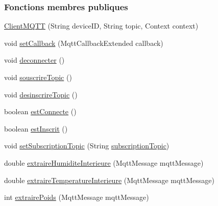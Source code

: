 \subsubsection*{Fonctions membres publiques}
\begin{DoxyCompactItemize}
\item 
\hyperlink{classfr_1_1campus_1_1laurainc_1_1honeybee_1_1_client_m_q_t_t_a98cc7dce4cade9ffacfa462fe2f97088}{Client\+M\+Q\+TT} (String device\+ID, String topic, Context context)
\item 
void \hyperlink{classfr_1_1campus_1_1laurainc_1_1honeybee_1_1_client_m_q_t_t_ace2e0a1f888cb34e2a5a5c241eb6b94a}{set\+Callback} (Mqtt\+Callback\+Extended callback)
\item 
void \hyperlink{classfr_1_1campus_1_1laurainc_1_1honeybee_1_1_client_m_q_t_t_af067ec55e00ec18a14e248279872242f}{deconnecter} ()
\item 
void \hyperlink{classfr_1_1campus_1_1laurainc_1_1honeybee_1_1_client_m_q_t_t_a4c5ae1bb188b2f3c770ab6112b7d8590}{souscrire\+Topic} ()
\item 
void \hyperlink{classfr_1_1campus_1_1laurainc_1_1honeybee_1_1_client_m_q_t_t_aad5d88947bbdb3b83d4bf915985947e3}{desinscrire\+Topic} ()
\item 
boolean \hyperlink{classfr_1_1campus_1_1laurainc_1_1honeybee_1_1_client_m_q_t_t_a06c30a7291f526d0bd9a47fccb3ac1ad}{est\+Connecte} ()
\item 
boolean \hyperlink{classfr_1_1campus_1_1laurainc_1_1honeybee_1_1_client_m_q_t_t_a8ec5abba65d09f44e1c2c8f9ef652632}{est\+Inscrit} ()
\item 
void \hyperlink{classfr_1_1campus_1_1laurainc_1_1honeybee_1_1_client_m_q_t_t_af30038554905358c24a7226544822ff3}{set\+Subscription\+Topic} (String \hyperlink{classfr_1_1campus_1_1laurainc_1_1honeybee_1_1_client_m_q_t_t_a8771380740ea2e139b595f5b8fa7e0a5}{subscription\+Topic})
\item 
double \hyperlink{classfr_1_1campus_1_1laurainc_1_1honeybee_1_1_client_m_q_t_t_ad7fd3fa1a51a608646b146765cfc4546}{extraire\+Humidite\+Interieure} (Mqtt\+Message mqtt\+Message)
\item 
double \hyperlink{classfr_1_1campus_1_1laurainc_1_1honeybee_1_1_client_m_q_t_t_a92cd25872cdb04978a55ae166f858e0d}{extraire\+Temperature\+Interieure} (Mqtt\+Message mqtt\+Message)
\item 
int \hyperlink{classfr_1_1campus_1_1laurainc_1_1honeybee_1_1_client_m_q_t_t_a390da1e77f256fd9d90093bfec544b55}{extraire\+Poids} (Mqtt\+Message mqtt\+Message)
\item 

\end{DoxyCompactItemize}
